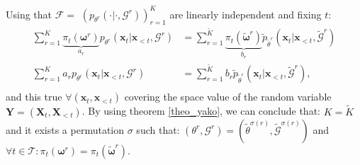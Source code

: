 Using that $\mathcal{F}=$ $\left(p_{\theta^r}(\cdot| \cdot,\mathcal{G}^r)\right)_{r=1}^K$ are linearly independent and fixing $t$: 
\begin{equation*}
\begin{aligned}
      \sum_{r=1}^K \underbrace{\pi_t(\boldsymbol{\omega}^r)}_{a_r}p_{\theta^r}(\boldsymbol{x}_t|\boldsymbol{x}_{<t},\mathcal{G}^r)&=
     \sum_{r=1}^{\tilde{K}}\underbrace{\pi_t(\boldsymbol{\tilde{\omega}}^r)}_{b_r}\tilde{p}_{\tilde{\theta}^r}(\boldsymbol{x}_t|\boldsymbol{x}_{<t},\tilde{\mathcal{G}}^r)\\
     \sum_{r=1}^K a_r p_{\theta^r}(\boldsymbol{x}_t|\boldsymbol{x}_{<t},\mathcal{G}^r)&=
     \sum_{r=1}^{\tilde{K}}b_r\tilde{p}_{\tilde{\theta}^r}(\boldsymbol{x}_t|\boldsymbol{x}_{<t},\tilde{\mathcal{G}}^r),\\
      \end{aligned}
\end{equation*}
and this true $\forall (\boldsymbol{x}_t,\boldsymbol{x}_{<t})$ covering the space value of the random variable $\boldsymbol{Y} = (\boldsymbol{X}_t,\boldsymbol{X}_{<t})$. By using theorem \ref{theo_yako}, we can conclude that: $K = \tilde{K}$ and it exists a permutation $\sigma$ such that: $(\theta^r, \mathcal{G}^r) = (\tilde{\theta}^{\sigma(r)}, \tilde{\mathcal{G}}^{\sigma(r)})$ and $\forall t \in \mathcal{T}: \pi_t(\boldsymbol{\omega}^r) = \pi_t(\boldsymbol{\tilde{\omega}}^r)$.

